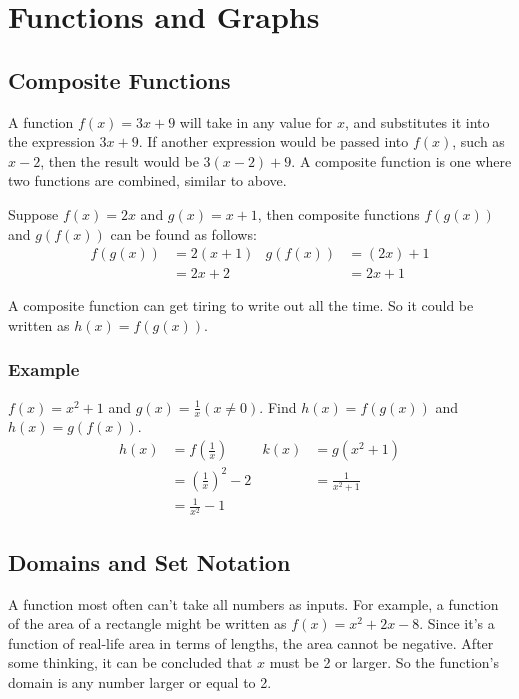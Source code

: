 \newcommand{\N}{\mathbb{N}}
\newcommand{\Z}{\mathbb{Z}}
\newcommand{\Q}{\mathbb{Q}}
\newcommand{\R}{\mathbb{R}}
\newcommand{\C}{\mathbb{C}}

\chapter{Functions and Graphs}
\section{Composite Functions}
A function $f(x) = 3x+9$ will take in any value for $x$, and substitutes it into the expression $3x+9$. If another expression would be passed into $f(x)$, such as $x-2$, then the result would be $3(x-2)+9$. A composite function is one where two functions are combined, similar to above.

Suppose $f(x) = 2x$ and $g(x) = x+1$, then composite functions $f(g(x))$ and $g(f(x))$ can be found as follows:
\begin{align*}
	f(g(x)) &= 2(x+1) & g(f(x)) &= (2x)+1\\
	&=2x+2 & &=2x+1
\end{align*}

A composite function can get tiring to write out all the time. So it could be written as $h(x)=f(g(x))$.

\subsection{Example}
$f(x)=x^2+1$ and $g(x)=\frac{1}{x} \left(x\neq0\right)$. Find $h(x)=f(g(x))$ and $h(x)=g(f(x))$.
\begin{align*}
	h(x)&=f\left(\frac{1}{x}\right) & k(x)&=g\left(x^2+1\right)\\
	&=\left(\frac{1}{x}\right)^2-2 & &=\frac{1}{x^2+1}\\
	&=\frac{1}{x^2}-1
\end{align*}


\section{Domains and Set Notation}
A function most often can't take all numbers as inputs. For example, a function of the area of a rectangle might be written as $f(x)=x^2+2x-8$. Since it's a function of real-life area in terms of lengths, the area cannot be negative. After some thinking, it can be concluded that $x$ must be 2 or larger. So the function's domain is any number larger or equal to 2.

